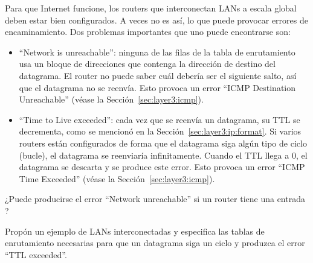 Para que Internet funcione, los routers que interconectan LANs a escala global deben estar bien configurados. 
A veces no es así, lo que puede provocar errores de encaminamiento. Dos problemas importantes 
que uno puede encontrarse son:
\begin{itemize}
\item ``Network is unreachable'': ninguna de las filas de la tabla de enrutamiento usa un bloque de direcciones que contenga la 
  dirección de destino del datagrama. 
  El router no puede saber cuál debería ser el siguiente salto, así que el datagrama no se reenvía.
  Esto provoca un error ``ICMP Destination Unreachable'' (véase la Sección~\ref{sec:layer3:icmp}).
  
\item ``Time to Live exceeded'': cada vez que se reenvía un datagrama,
  su TTL se decrementa, como se mencionó en la Sección~\ref{sec:layer3:ip:format}.
  Si varios routers están configurados de forma que el datagrama siga algún tipo de ciclo (bucle), 
  el datagrama se reenviaría infinitamente.
  Cuando el TTL llega a 0, el datagrama se descarta y se produce este error.
  Esto provoca un error ``ICMP Time Exceeded'' (véase la Sección~\ref{sec:layer3:icmp}).
\end{itemize}

\begin{exercise}
¿Puede producirse el error ``Network unreachable'' si un router tiene una entrada ?
\end{exercise}

\begin{exercise}
Propón un ejemplo de LANs interconectadas y especifica las tablas de enrutamiento necesarias para que un datagrama 
siga un ciclo y produzca el error ``TTL exceeded''.
\end{exercise}

